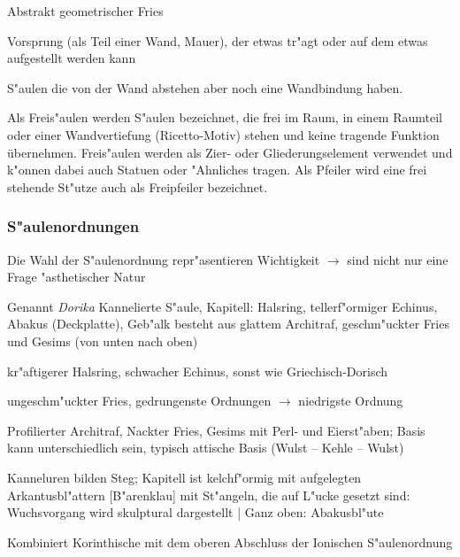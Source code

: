 \documentclass[emulatestandardclasses]{scrartcl}
\begin{document}
\begin{description}[leftmargin=!,labelwidth=\widthof{\bfseries Zahnschnitt}]
  \item[Zahnschnitt] Abstrakt geometrischer Fries
  \item[Konsole] Vorsprung (als Teil einer Wand, Mauer), der etwas tr"agt oder auf dem etwas aufgestellt werden kann
  \item[Vorlage] S"aulen die von der Wand abstehen aber noch eine Wandbindung haben.
  \item[Freis"aule] Als Freis"aulen werden S"aulen bezeichnet, die frei im Raum, in einem Raumteil oder einer Wandvertiefung (Ricetto-Motiv) stehen und keine tragende Funktion übernehmen. Freis"aulen werden als Zier- oder Gliederungselement verwendet und k"onnen dabei auch Statuen oder "Ahnliches tragen. Als Pfeiler wird eine frei stehende St"utze auch als Freipfeiler bezeichnet.
\end{description}

\subsubsection{S"aulenordnungen}

Die Wahl der S"aulenordnung repr"asentieren Wichtigkeit $\rightarrow$ sind nicht nur eine Frage "asthetischer Natur\\

\begin{description}[leftmargin=!,labelwidth=\widthof{\bfseries Griechisch-Doris}]
  \item[Griechisch-Dorisch] Genannt \emph{Dorika} Kannelierte S"aule, Kapitell: Halsring, tellerf"ormiger Echinus, Abakus (Deckplatte), Geb"alk besteht aus glattem Architraf, geschm"uckter Fries und Gesims (von unten nach oben) 
  \item[R"omisch-Dorisch] kr"aftigerer Halsring, schwacher Echinus, sonst wie Griechisch-Dorisch
  \item[Toskanisch] ungeschm"uckter Fries, gedrungenste Ordnungen $\rightarrow$ niedrigste Ordnung
  \item[Ionisch] Profilierter Architraf, Nackter Fries, Gesims mit Perl- und Eierst"aben; Basis kann unterschiedlich sein, typisch attische Basis (Wulst -- Kehle -- Wulst)
  \item[Korinthisch] Kanneluren bilden Steg; Kapitell ist kelchf"ormig mit aufgelegten Arkantusbl"attern [B"arenklau] mit St"angeln, die auf L"ucke gesetzt sind: Wuchsvorgang wird skulptural dargestellt | Ganz oben: Abakusbl"ute
  \item[Komposit] Kombiniert Korinthische mit dem oberen Abschluss der Ionischen S"aulenordnung

\end{description}
\end{document}
